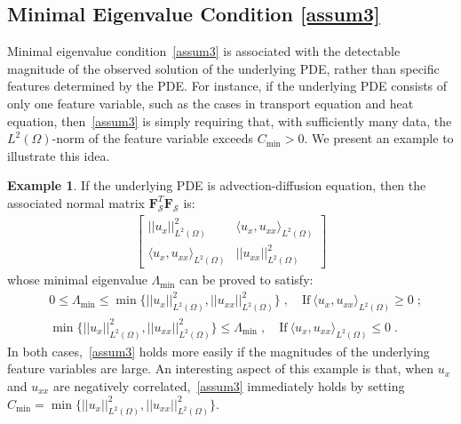 \documentclass[a4paper,11pt]{article}
\newcommand{\bF}{\mathbf{F}}
\newcommand{\mS}{\mathcal{S}}
\theoremstyle{definition}
\newtheorem{example}{Example}[section]
\begin{document}
\subsection{Minimal Eigenvalue Condition \eqref{assum3}}\label{sec.minimalEigen}
Minimal eigenvalue condition~\eqref{assum3} is associated with the detectable magnitude of the observed solution of the underlying PDE, rather than specific features determined by the PDE. For instance, if the underlying PDE consists of only one feature variable, such as the cases in transport equation and heat equation, then~\eqref{assum3} is simply requiring that, with sufficiently many data, the $L^2(\Omega)$-norm of the  feature variable exceeds $C_{\min}>0$. We present an example to illustrate this idea.
\begin{example} If the underlying PDE is advection-diffusion equation, then the associated normal matrix $\bF_\mS^T\bF_\mS$ is:
\begin{align*}
\begin{bmatrix}
||u_x||^2_{L^2(\Omega)}&\langle u_x,u_{xx}\rangle_{L^2(\Omega)}\\
\langle u_x,u_{xx}\rangle_{L^2(\Omega)}&||u_{xx}||^2_{L^2(\Omega)}
\end{bmatrix}
\end{align*}
whose minimal eigenvalue $\Lambda_{\min}$ can be proved to satisfy:
\begin{align*}
&0\leq \Lambda_{\min}\leq \min\{||u_x||^2_{L^2(\Omega)},||u_{xx}||^2_{L^2(\Omega)}\}\;,\quad\text{If}~\langle u_x,u_{xx}\rangle_{L^2(\Omega)}\geq 0\;;\\
&\min\{||u_x||^2_{L^2(\Omega)},||u_{xx}||^2_{L^2(\Omega)}\}\leq \Lambda_{\min}\;,\quad\text{If}~\langle u_x,u_{xx}\rangle_{L^2(\Omega)}\leq 0\;.
\end{align*}
In both cases,~\eqref{assum3} holds more easily if the magnitudes of the underlying feature variables are large. An interesting aspect of this example is that, when $u_x$ and $u_{xx}$ are negatively correlated,~\eqref{assum3} immediately holds by setting $C_{\min} = \min\{||u_x||^2_{L^2(\Omega)},||u_{xx}||^2_{L^2(\Omega)}\}$.
\end{example}
\end{document}
